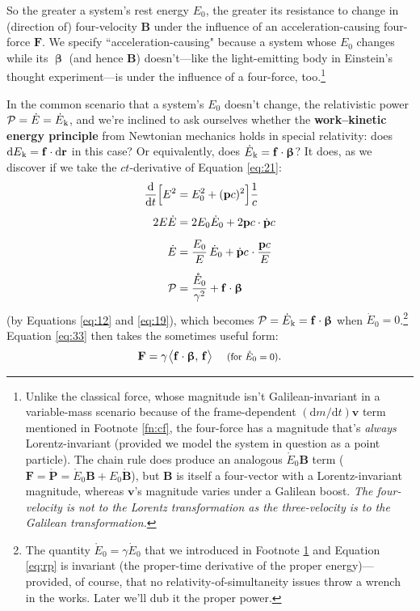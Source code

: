 \documentclass[12pt]{article}
\renewcommand{\vv}[1]{\mathbf{#1}}
\newcommand{\dd}[1]{\mathrm{d}#1}
\newcommand{\vvbeta}{\bm{\upbeta}}
\begin{document}
So the greater a system's rest energy $E_0$, the greater its resistance to change in (direction of) four-velocity $\vv B$ under the influence of an acceleration-causing four-force $\vv F$. We specify ``acceleration-causing" because a system whose $E_0$ changes while its $\vvbeta$ (and hence $\vv B$) doesn't---like the light-emitting body in Einstein's thought experiment---is under the influence of a four-force, too.\footnote{\label{fn:fo}Unlike the classical force, whose magnitude isn't Galilean-invariant in a variable-mass scenario because of the frame-dependent $(\dd m / \dd t) \vv v$ term mentioned in Footnote \ref{fn:cf}, the four-force has a magnitude that's \emph{always} Lorentz-invariant (provided we model the system in question as a point particle). The chain rule does produce an analogous $\mathring{E}_0 \vv B$ term ($\vv F = \mathring{\vv P} = \mathring{E}_0 \vv B + E_0 \mathring{\vv B}$), but $\vv B$ is itself a four-vector with a Lorentz-invariant magnitude, whereas $\vv v$'s magnitude varies under a Galilean boost. \emph{The four-velocity is \emph{not} to the Lorentz transformation as the three-velocity is to the Galilean transformation.}}

In the common scenario that a system's $E_0$ doesn't change, the relativistic power $\mathcal{P} = \dot{E} = \dot{E}_{\mkern.5mu \textrm{k}}$, and we're inclined to ask ourselves whether the \textbf{work--kinetic energy principle} from Newtonian mechanics holds in special relativity: does $\dd E_{\mkern.5mu \textrm{k}} = \vv f \cdot \dd \vv r$ in this case? Or equivalently, does $\dot{E}_{\mkern.5mu \textrm{k}} = \vv f \cdot \vvbeta$? It does, as we discover if we take the $ct$-derivative of Equation \ref{eq:21}:
\begin{equation}\label{eq:rp}
\begin{split}
\frac{\dd}{\dd t} \Big[ E^2  &= E_0^2 + (\vv p c)^2 \Big] \frac{1}{c}\\[5pt]
2E \dot{E} &= 2 E_0 \dot{E}_0 + 2 \vv p c \cdot \dot{\vv p} c\\[5pt]
\dot{E} &= \dfrac{E_0}{E} \, \dot{E}_0 + \dot{\vv p} c \mkern1mu \cdot \dfrac{\vv p c}{E} \\[5pt]
\mathcal{P} &= \dfrac{\mathring{E}_0}{\gamma^2} + \vv f \cdot \vvbeta
\end{split}
\end{equation}
(by Equations \ref{eq:12} and \ref{eq:19}), which becomes $\mathcal{P} = \dot{E}_{\mkern.5mu \textrm{k}} = \vv f \cdot \vvbeta$ when $\dot{E}_0 = 0$.\footnote{The quantity $\mathring{E}_0 = \gamma \dot{E}_0$ that we introduced in Footnote \ref{fn:fo} and Equation \ref{eq:rp} is invariant (the proper-time derivative of the proper energy)---provided, of course, that no relativity-of-simultaneity issues throw a wrench in the works. Later we'll dub it the proper power.} Equation \ref{eq:33} then takes the sometimes useful form:
\begin{equation}\label{eq:fb}
\vv F = \gamma \mkern1.5mu \big \langle \vv f \cdot \vvbeta, \, \vv f \big \rangle \quad \textrm{\footnotesize{ (for $\mathring{E}_0 = 0$)}}.
\end{equation}
\end{document}
